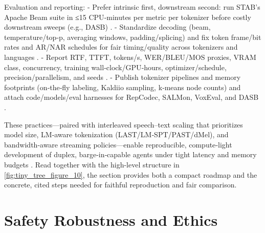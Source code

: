 \documentclass{article}
\begin{document}
Evaluation and reporting:
- Prefer intrinsic first, downstream second: run STAB’s Apache Beam suite in ≤15 CPU‑minutes per metric per tokenizer before costly downstream sweeps (e.g., DASB) \cite{vashishth2024stabspeechtokenizerassessmentbenchmark,mousavi2024dasbdiscreteaudiospeechbenchmark}.
- Standardize decoding (beam, temperature/top‑p, averaging windows, padding/splicing) and fix token frame/bit rates and AR/NAR schedules for fair timing/quality across tokenizers and languages \cite{vashishth2024stabspeechtokenizerassessmentbenchmark,onda2025benchmarkingprosodyencodingdiscretespeec,entry2025indicsuperbspeechprocessinguniversalperf}.
- Report RTF, TTFT, tokens/s, WER/BLEU/MOS proxies, VRAM class, concurrency, training wall‑clock/GPU‑hours, optimizer/schedule, precision/parallelism, and seeds \cite{maimon2025slammingtrainingspeechlanguagemodelonegp,chen2023reducingbarriersselfsupervisedlearninghu,maimon2025scalinganalysisinterleavedspeechtextlang}.
- Publish tokenizer pipelines and memory footprints (on‑the‑fly labeling, Kaldiio sampling, k‑means node counts) and attach code/models/eval harnesses for RepCodec, SALMon, VoxEval, and DASB \cite{chen2023reducingbarriersselfsupervisedlearninghu,huang2024repcodecspeechrepresentationcodectokeniz,maimon2025salmonsuiteacousticlanguagemodelevaluati,cui2025voxevalbenchmarkingknowledgeunderstandin,mousavi2024dasbdiscreteaudiospeechbenchmark}.

These practices—paired with interleaved speech–text scaling that prioritizes model size, LM‑aware tokenization (LAST/LM‑SPT/PAST/dMel), and bandwidth‑aware streaming policies—enable reproducible, compute‑light development of duplex, barge‑in‑capable agents under tight latency and memory budgets \cite{turetzky2024lastlanguagemodelawarespeechtokenization,jo2025lmsptalignedsemanticdistillationspeechto,har-tuv2025pastphoneticacousticspeechtokenizer,bai2025dmelspeechtokenizationmadesimple,maimon2025scalinganalysisinterleavedspeechtextlang}. Read together with the high-level structure in \autoref{fig:tiny_tree_figure_10}, the section provides both a compact roadmap and the concrete, cited steps needed for faithful reproduction and fair comparison.






\section{Safety Robustness and Ethics} \label{sec:Safety Robustness and Ethics}
\end{document}
